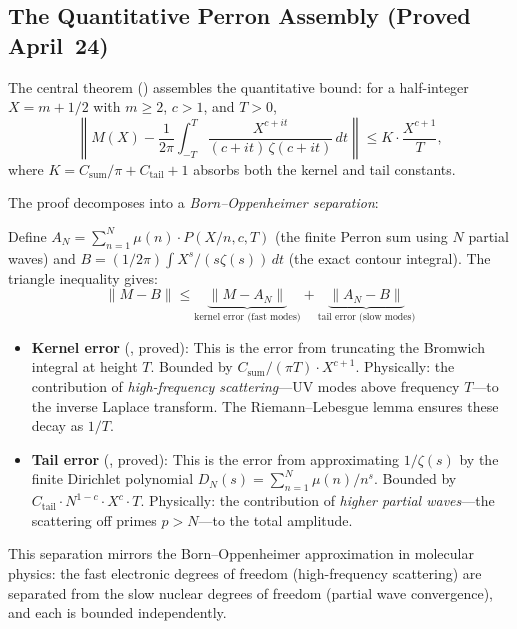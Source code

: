 \documentclass[11pt,a4paper]{article}
\begin{document}
\subsection{The Quantitative Perron Assembly (Proved April~24)}

The central theorem 
() assembles the quantitative bound:
for a half-integer $X = m + 1/2$ with $m \geq 2$, $c > 1$, and $T > 0$,
\[
  \left\| M(X) - \frac{1}{2\pi} \int_{-T}^{T}
  \frac{X^{c+it}}{(c+it)\,\zeta(c+it)}\,dt \right\|
  \leq K \cdot \frac{X^{c+1}}{T},
\]
where $K = C_{\mathrm{sum}}/\pi + C_{\mathrm{tail}} + 1$ absorbs
both the kernel and tail constants.

The proof decomposes into a \emph{Born--Oppenheimer separation}:

\begin{correspondence}
\label{corr:born-oppenheimer}
Define $A_N = \sum_{n=1}^{N} \mu(n) \cdot P(X/n, c, T)$ (the finite
Perron sum using $N$ partial waves) and $B = (1/2\pi)\int X^s/(s\zeta(s))\,dt$
(the exact contour integral). The triangle inequality gives:
\[
  \|M - B\| \leq \underbrace{\|M - A_N\|}_{\text{kernel error (fast modes)}}
  + \underbrace{\|A_N - B\|}_{\text{tail error (slow modes)}}
\]
\begin{itemize}
  \item \textbf{Kernel error} (,
    proved): This is the error from truncating the Bromwich integral at
    height $T$. Bounded by $C_{\mathrm{sum}}/(\pi T) \cdot X^{c+1}$.
    Physically: the contribution of \emph{high-frequency scattering}---UV
    modes above frequency $T$---to the inverse Laplace transform. The
    Riemann--Lebesgue lemma ensures these decay as $1/T$.

  \item \textbf{Tail error} (,
    proved): This is the error from approximating $1/\zeta(s)$ by
    the finite Dirichlet polynomial $D_N(s) = \sum_{n=1}^{N} \mu(n)/n^s$.
    Bounded by $C_{\mathrm{tail}} \cdot N^{1-c} \cdot X^c \cdot T$.
    Physically: the contribution of \emph{higher partial waves}---the
    scattering off primes $p > N$---to the total amplitude.
\end{itemize}
This separation mirrors the Born--Oppenheimer approximation in molecular
physics: the fast electronic degrees of freedom (high-frequency scattering)
are separated from the slow nuclear degrees of freedom (partial wave convergence),
and each is bounded independently.
\end{correspondence}
\end{document}

